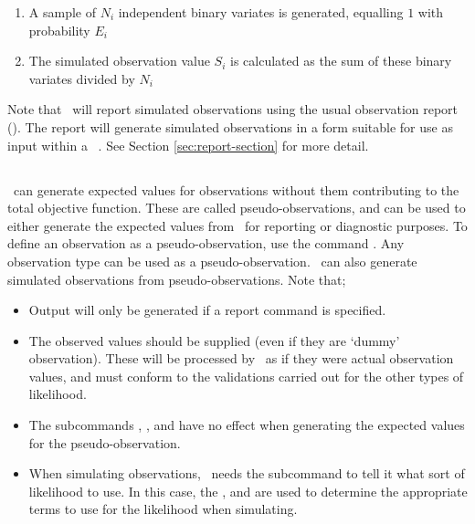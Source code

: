 \begin{enumerate}
  \begin{enumerate}
    \item{} A sample of $N_i$ independent binary variates is generated, equalling $1$ with probability $E_i$ 
    \item{}	The simulated observation value $S_i$ is calculated as the sum of these binary variates divided by $N_i$
  \end{enumerate}
\end{enumerate}

Note that \SPM\ will report simulated observations using the usual observation report (). The report  will generate simulated observations in a form suitable for use as input within a \SPM\ \config. See Section \ref{sec:report-section} for more detail.

\subsection{}

\SPM\ can generate expected values for observations without them contributing to the total objective function. These are called pseudo-observations, and can be used to either generate the expected values from \SPM\ for reporting or diagnostic purposes. To define an observation as a pseudo-observation, use the command . Any observation type can be used as a pseudo-observation. \SPM\ can also generate simulated observations from pseudo-observations. Note that;

\begin{itemize}
  \item Output will only be generated if a report command  is specified.
  \item The observed values should be supplied (even if they are `dummy' observation). These will be processed by \SPM\ as if they were actual observation values, and must conform to the validations carried out for the other types of likelihood. 
  \item The subcommands , ,  and  have no effect when generating the expected values for the pseudo-observation.   
  \item When simulating observations, \SPM\ needs the subcommand  to tell it what sort of likelihood to use. In this case, the ,  and  are used to determine the appropriate terms to use for the likelihood when simulating.
\end{itemize}




